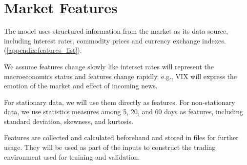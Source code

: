 \section{Market Features}
The model uses structured information from the market as its data source, including interest rates, commodity prices and currency exchange indexes. (\autoref{appendix:features_list}).
\par
We assume features change slowly like interset rates will represent the macroeconomics status and features change rapidly, e.g., VIX will express the emotion of the market and effect of incoming news.

\par
For stationary data, we will use them directly as features. For non-stationary data, we use statistics measures among 5, 20, and 60 days as features, including standard deviation, skewness, and kurtosis.
\par
Features are collected and calculated beforehand and stored in files for further usage. They will be used as part of the inputs to construct the trading environment used for training and validation.
